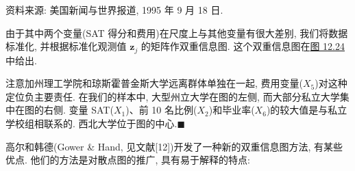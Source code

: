 {资料来源: 美国新闻与世界报道, 1995 年 9 月 18 日.}

由于其中两个变量(SAT 得分和费用)在尺度上与其他变量有很大差别, 我们将数据标准化, 并根据标准化观测值 $\mathbf{z}_j$ 的矩阵作双重信息图. 这个双重信息图在\hyperref[fig:12.24]{图 12.24} 中给出.

注意加州理工学院和琼斯霍普金斯大学远离群体单独在一起, 费用变量($X_5$)对这种定位负主要责任. 在我们的样本中, 大型州立大学在图的左侧, 而大部分私立大学集中在图的右侧. 变量 SAT($X_1$)、前 10 名比例($X_2$)和毕业率($X_6$)的较大值是与私立学校组相联系的. 西北大学位于图的中心.\hfill$\blacksquare$

高尔和韩德(Gower \& Hand, 见文献[12])开发了一种新的双重信息图方法, 有某些优点. 他们的方法是对散点图的推广, 具有易于解释的特点:
